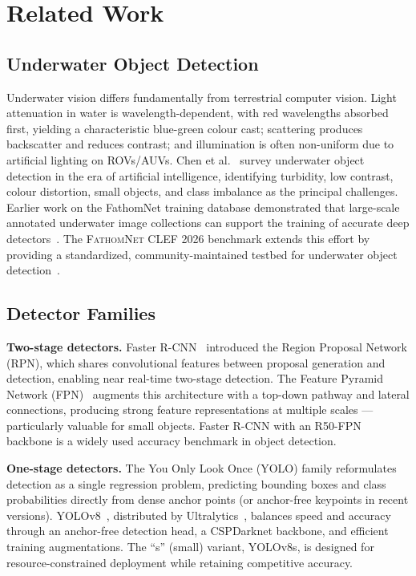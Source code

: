 \documentclass[11pt,a4paper]{article}
\newcommand{\dataset}{\textsc{FathomNet CLEF 2026}}
\begin{document}
\section{Related Work}
\label{sec:related-work}

\subsection{Underwater Object Detection}
Underwater vision differs fundamentally from terrestrial computer vision. Light attenuation in water is wavelength-dependent, with red wavelengths absorbed first, yielding a characteristic blue-green colour cast; scattering produces backscatter and reduces contrast; and illumination is often non-uniform due to artificial lighting on ROVs/AUVs. Chen et al.~\cite{underwater-survey} survey underwater object detection in the era of artificial intelligence, identifying turbidity, low contrast, colour distortion, small objects, and class imbalance as the principal challenges. Earlier work on the FathomNet training database demonstrated that large-scale annotated underwater image collections can support the training of accurate deep detectors~\cite{fathomnet-2021-workshop}. The \dataset{} benchmark extends this effort by providing a standardized, community-maintained testbed for underwater object detection~\cite{fathomnet-clef-2026}.

\subsection{Detector Families}

\textbf{Two-stage detectors.} Faster R-CNN~\cite{fasterrcnn2015} introduced the Region Proposal Network (RPN), which shares convolutional features between proposal generation and detection, enabling near real-time two-stage detection. The Feature Pyramid Network (FPN)~\cite{fpn2017} augments this architecture with a top-down pathway and lateral connections, producing strong feature representations at multiple scales --- particularly valuable for small objects. Faster R-CNN with an R50-FPN backbone is a widely used accuracy benchmark in object detection.

\textbf{One-stage detectors.} The You Only Look Once (YOLO) family reformulates detection as a single regression problem, predicting bounding boxes and class probabilities directly from dense anchor points (or anchor-free keypoints in recent versions). YOLOv8~\cite{yolov8_2023}, distributed by Ultralytics~\cite{ultralytics}, balances speed and accuracy through an anchor-free detection head, a CSPDarknet backbone, and efficient training augmentations. The ``s'' (small) variant, YOLOv8s, is designed for resource-constrained deployment while retaining competitive accuracy.
\end{document}
